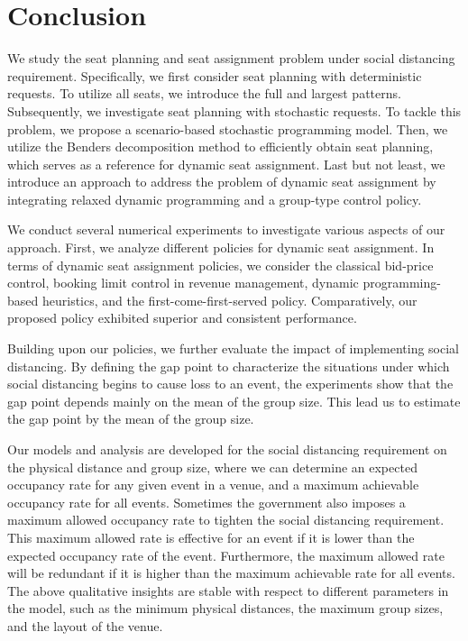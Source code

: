 \section{Conclusion}\label{sec_conclusion}
We study the seat planning and seat assignment problem under social distancing requirement. 
Specifically, we first consider seat planning with deterministic requests. To utilize all seats, we introduce the full and largest patterns. Subsequently, we investigate seat planning with stochastic requests. To tackle this problem, we propose a scenario-based stochastic programming model.
Then, we utilize the Benders decomposition method to efficiently obtain seat planning, which serves as a reference for dynamic seat assignment. Last but not least, we introduce an approach to address the problem of dynamic seat assignment by integrating relaxed dynamic programming and a group-type control policy. 

We conduct several numerical experiments to investigate various aspects of our approach. First, we analyze different policies for dynamic seat assignment. In terms of dynamic seat assignment policies, we consider the classical bid-price control, booking limit control in revenue management, dynamic programming-based heuristics, and the first-come-first-served policy. Comparatively, our proposed policy exhibited superior and consistent performance.

Building upon our policies, we further evaluate the impact of implementing social distancing. By defining the gap point to characterize the situations under which social distancing begins to cause loss to an event, the experiments show that the gap point depends mainly on the mean of the group size.
This lead us to estimate the gap point by the mean of the group size.

Our models and analysis are developed for the social distancing requirement on the physical distance and group size, where we can determine an expected occupancy rate for any given event in a venue, and a maximum achievable occupancy rate for all events. Sometimes the government also imposes a maximum allowed occupancy rate to tighten the social distancing requirement. This maximum allowed rate is effective for an event if it is lower than the expected occupancy rate of the event. Furthermore,
the maximum allowed rate will be redundant if it is higher than the maximum achievable rate for all
events. The above qualitative insights are stable with respect to different parameters in the model, such as the minimum physical distances, the maximum group sizes, and the layout of the venue.



